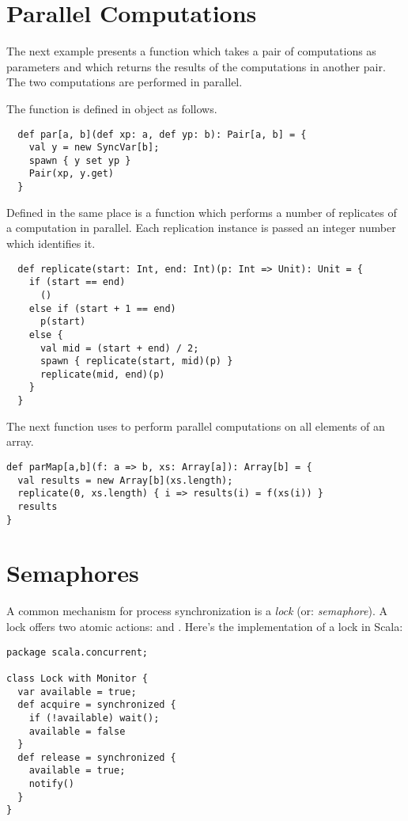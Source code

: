 {\section{Parallel Computations}

The next example presents a function  which takes a pair of
computations as parameters and which returns the results of the computations
in another pair. The two computations are performed in parallel.

The function is defined in object
 as follows.
\begin{lstlisting}
  def par[a, b](def xp: a, def yp: b): Pair[a, b] = {
    val y = new SyncVar[b];
    spawn { y set yp }
    Pair(xp, y.get)
  }
\end{lstlisting}
Defined in the same place is a function  which performs a
number of replicates of a computation in parallel. Each
replication instance is passed an integer number which identifies it.
\begin{lstlisting}
  def replicate(start: Int, end: Int)(p: Int => Unit): Unit = {
    if (start == end) 
      ()
    else if (start + 1 == end)
      p(start)
    else {
      val mid = (start + end) / 2;
      spawn { replicate(start, mid)(p) }
      replicate(mid, end)(p)
    }
  }
\end{lstlisting}

The next function uses  to perform parallel
computations on all elements of an array.

\begin{lstlisting}
def parMap[a,b](f: a => b, xs: Array[a]): Array[b] = {
  val results = new Array[b](xs.length);
  replicate(0, xs.length) { i => results(i) = f(xs(i)) }
  results
}
\end{lstlisting}

\section{Semaphores}

A common mechanism for process synchronization is a {\em lock} (or:
{\em semaphore}). A lock offers two atomic actions:  and
. Here's the implementation of a lock in Scala:

\begin{lstlisting}
package scala.concurrent;

class Lock with Monitor {
  var available = true;
  def acquire = synchronized {
    if (!available) wait();
    available = false
  }
  def release = synchronized {
    available = true;
    notify()
  }
}
\end{lstlisting}

}
